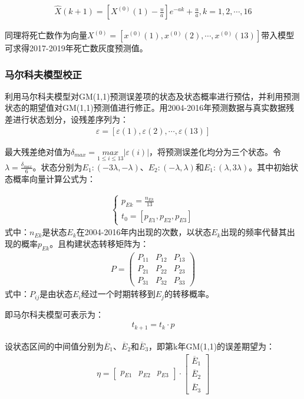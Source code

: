 \documentclass{whutmod}
\begin{document}
	     \begin{gather}
	     \widehat{X}(k+1)=[X^{(0)}(1)-\frac{u}{a}]e^{-ak}+\frac{u}{a},k=1,2,\cdots,16
	     \end{gather}
	     
	     同理将死亡数作为向量$X^{(0)}=[x^{(0)}(1),x^{(0)}(2),\cdots,x^{(0)}(13)]$带入模型可求得2017-2019年死亡数灰度预测值。
	     \subsubsection{马尔科夫模型校正}
	     利用马尔科夫模型对GM(1,1)预测误差项的状态及状态概率进行预估，并利用预测状态的期望值对GM(1,1)预测值进行修正\cite{bib:2}。用2004-2016年预测数据与真实数据残差进行状态划分，设残差序列为：
	     \begin{gather*}
	    \varepsilon =[\varepsilon(1) ,\varepsilon(2), \cdots,\varepsilon(13)]
	     \end{gather*}
	     
	    最大残差绝对值为$\delta _{max}=\underset{1\leqslant i\leqslant13 }{max}\left | \varepsilon(i) \right |$，将预测误差化均分为三个状态。令$\lambda =\frac{\delta _{max}}{6}$。状态分别为$E_{1}:(-3\lambda,-\lambda)$、$E_{2}:(-\lambda,\lambda)$和$E_{1}:(\lambda,3\lambda)$。其中初始状态概率向量计算公式为：
	    
	   \begin{gather}
	 \left\{\begin{matrix}
	 p_{Ek}=\frac{n_{Ek}}{13}\\
	 t_{0}=[p_{E1},p_{E2},p_{E3}]
	 \end{matrix}\right.
	  \end{gather}
	  式中：$n_{Ek}$是状态$E_{k}$在2004-2016年内出现的次数，以状态$E_{k}$出现的频率代替其出现的概率$p_{Ek}$。且构建状态转移矩阵为：
	   \begin{gather*}
	  P=\left(\begin{array}{lll}{P_{11}} & {P_{12}} & {P_{13}} \\ {P_{21}} & {P_{22}} & {P_{23}} \\ {P_{31}} & {P_{32}} & {P_{33}}\end{array}\right)
	  \end{gather*}
	   式中：$P_{ij}$是由状态$E_{i}$经过一个时期转移到$E_{j}$的转移概率。
	   
	   即马尔科夫模型可表示为：	  
	   \begin{gather}
	   t_{k+1}=t_{k} \cdot p
	  \end{gather}
	  
	  设状态区间的中间值分别为$\overline{E}_{1}$、$\overline{E}_{2}$和$\overline{E}_{3}$，即第k年GM(1,1)的误差期望为：
	   \begin{gather}
\eta =\begin{bmatrix}
p_{E1} & p_{E2} & p_{E3}
\end{bmatrix} \cdot\begin{bmatrix}
\overline{E}_{1}\\ 
\overline{E}_{2}\\ 
\overline{E}_{3}
\end{bmatrix}
	  \end{gather}
	  
\end{document}
